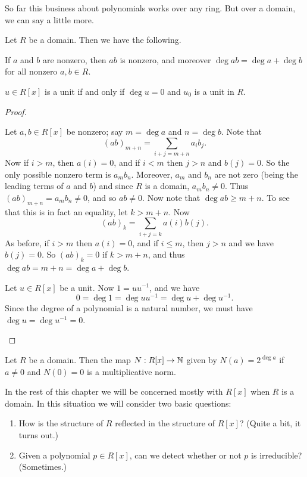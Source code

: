 So far this business about polynomials works over any ring. But over a domain, we can say a little more.

\begin{prop}
Let \(R\) be a domain. Then we have the following.
\begin{proplist*}
\item If $a$ and $b$ are nonzero, then $ab$ is nonzero, and moreover \(\deg{ab} = \deg{a} + \deg{b}\) for all nonzero \(a,b \in R\).
\item \(u \in R[x]\) is a unit if and only if \(\deg{u} = 0\) and \(u_0\) is a unit in \(R\).
\end{proplist*}
\end{prop}

\begin{proof}
\begin{inlineproplist}
\item Let $a,b \in R[x]$ be nonzero; say $m = \deg{a}$ and $n = \deg{b}$. Note that \[ (ab)_{m+n} = \sum_{i+j = m+n} a_ib_j. \] Now if $i > m$, then $a(i) = 0$, and if $i < m$ then $j > n$ and $b(j) = 0$. So the only possible nonzero term is $a_mb_n$. Moreover, $a_m$ and $b_n$ are not zero (being the leading terms of $a$ and $b$) and since $R$ is a domain, $a_mb_n \neq 0$. Thus $(ab)_{m+n} = a_mb_n \neq 0$, and so $ab \neq 0$. Now note that $\deg{ab} \geq m+n$. To see that this is in fact an equality, let $k > m+n$. Now \[ (ab)_k = \sum_{i+j = k} a(i)b(j). \] As before, if $i > m$ then $a(i) = 0$, and if $i \leq m$, then $j > n$ and we have $b(j) = 0$. So $(ab)_k = 0$ if $k > m+n$, and thus $\deg{ab} = m+n = \deg{a} + \deg{b}$.
\item Let $u \in R[x]$ be a unit. Now $1 = uu^{-1}$, and we have \[ 0 = \deg{1} = \deg{uu^{-1}} = \deg{u} + \deg{u^{-1}}. \] Since the degree of a polynomial is a natural number, we must have $\deg{u} = \deg{u^{-1}} = 0$.
\end{inlineproplist}
\end{proof}

\begin{cor}
Let \(R\) be a domain. Then the map \(N : R[x] \rightarrow \mathbb{N}\) given by \(N(a) = 2^{\deg{a}}\) if $a \neq 0$ and $N(0) = 0$ is a multiplicative norm.
\end{cor}

In the rest of this chapter we will be concerned mostly with \(R[x]\) when \(R\) is a domain. In this situation we will consider two basic questions:

\begin{framed}
\begin{enumerate}
\item How is the structure of \(R\) reflected in the structure of \(R[x]\)? (Quite a bit, it turns out.)
\item Given a polynomial \(p \in R[x]\), can we detect whether or not \(p\) is irreducible? (Sometimes.)
\end{enumerate}
\end{framed}



